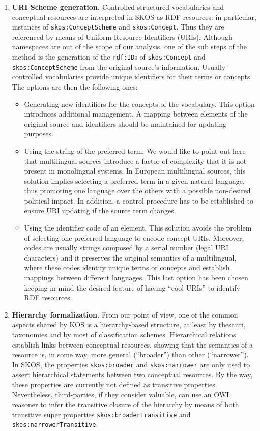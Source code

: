 \begin{enumerate}
 \item \textbf{URI Scheme generation.} Controlled structured vocabularies and conceptual resources are interpreted in SKOS as RDF 
 resources: in particular, instances of \texttt{skos:ConceptScheme} and \texttt{skos:Concept}. Thus they are referenced by 
 means of Uniform Resource Identifiers (URIs).  Although namespaces are out of the scope of our analysis, one 
 of the sub steps of the method is the generation of the \texttt{rdf:ID}s of \texttt{skos:Concept} and \texttt{skos:ConceptScheme} 
 from the original source's information. Usually controlled vocabularies provide unique identifiers for their terms or concepts. 
 The options are then the following ones:
 \begin{itemize}
  \item Generating new identifiers for the concepts of the vocabulary. This option introduces additional management. 
  A mapping between elements of the original source and identifiers should be maintained for updating purposes.
  \item Using the string of the preferred term. We would like to point out here that multilingual sources introduce a 
  factor of complexity that it is not present in monolingual systems. In European multilingual sources, this solution 
  implies selecting a preferred term in a given natural language, thus promoting one language over the others with a 
  possible non-desired political impact. In addition, a control procedure has to be established to ensure URI updating if the source term changes.
  \item Using the identifier code of an element. This solution avoids the problem of selecting one preferred language 
  to encode concept URIs. Moreover, codes are usually strings composed by a serial number 
  (legal URI characters) and it preserves the original semantics of a multilingual,
  where these codes identify unique terms or concepts and establish mappings between different languages. 
  This last option has been chosen keeping in mind the desired feature of having ``cool URIs'' to identify RDF resources.
 \end{itemize}

 \item \textbf{Hierarchy formalization.} From our point of view, one of the common aspects shared by 
 KOS is a hierarchy-based structure, at least by thesauri, taxonomies and by most of 
 classification schemes. Hierarchical relations establish links between conceptual resources, 
 showing that the semantics of a resource is, in some way, more general (``broader'') than other (``narrower''). 
 In SKOS, the properties \texttt{skos:broader} and \texttt{skos:narrower} are only used to assert hierarchical 
 statements between two conceptual resources. By the way, these properties are currently not defined 
 as transitive properties. Nevertheless, third-parties, if they consider valuable, can use an OWL reasoner 
 to infer the transitive closure of the hierarchy by means of both transitive super properties 
 \texttt{skos:broaderTransitive} and \texttt{skos:narrowerTransitive}.
 

\end{enumerate}
